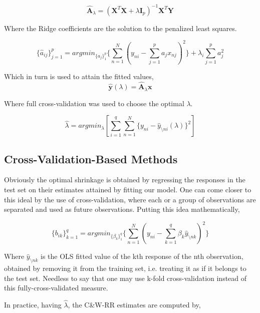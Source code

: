 \documentclass[a4paper]{article}
\begin{document}
\begin{equation}
\hat{\mathbf{A}}_{\lambda} = (\mathbf{X}^T\mathbf{X} + \lambda \mathbf{I}_p)^{-1} \mathbf{X}^T\mathbf{Y}
\end{equation}

Where the Ridge coefficients are the solution to the penalized least squares.

\begin{equation}
\{ \hat{a}_{ij} \}_{j = 1}^p = argmin_{\{ a_j \}_1^p} \{ \sum_{n = 1}^N (y_{ni} - \sum_{j = 1}^p a_jx_{nj})^2 \} + \lambda_i \sum_{j = 1}^p a_j^2
\end{equation}

Which in turn is used to attain the fitted values,
\begin{equation}
\mathbf{\hat{y}}(\lambda) = \hat{\mathbf{A}}_{\lambda} \mathbf{x}
\end{equation}

Where full cross-validation was used to choose the optimal $\lambda$.

\begin{equation}
\hat{\lambda} = argmin_{\lambda}[\sum_{i = 1}^{q}\sum_{n = 1}^N \{ y_{ni} - \hat{y}_{\setminus ni}(\lambda)  \}^2]
\end{equation}

\subsection{Cross-Validation-Based Methods}
Obviously the optimal shrinkage is obtained by regressing the responses in the test set on their estimates attained by fitting our model. One can come closer to this ideal by the use of cross-validation, where each or a group of observations are separated and used as future observations. Putting this idea mathematically,

\begin{equation}
\{ b_{ik} \}_{k = 1}^q = argmin_{\{ \beta_k \}_1^q} \{ \sum_{n = 1}^N (y_{ni} - \sum_{k = 1}^q \beta_k \hat{y}_{\setminus nk})^2 \}
\end{equation}

Where $\hat{y}_{\setminus nk}$ is the OLS fitted value of the kth response of the nth observation, obtained by removing it from the training set, i.e. treating it as if it belongs to the test set. Needless to say that one may use k-fold cross-validation instead of this fully-cross-validated measure.

In practice, having $\hat{\lambda}$, the C\&W-RR estimates are computed by,
\end{document}
